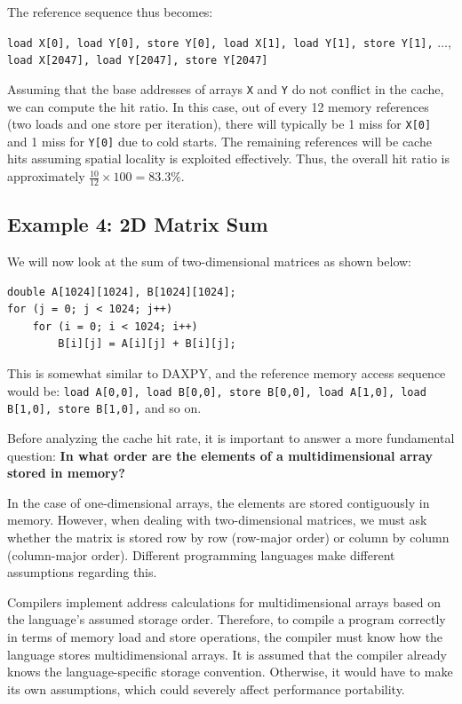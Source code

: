\documentclass[12pt]{book}
\begin{document}
The reference sequence thus becomes: 
\begin{center}
\texttt{load X[0], load Y[0], store Y[0], load X[1], load Y[1], store Y[1],} $\dots$, \texttt{load X[2047], load Y[2047], store Y[2047]}
\end{center}

Assuming that the base addresses of arrays \texttt{X} and \texttt{Y} do not conflict in the cache, we can compute the hit ratio. In this case, out of every 12 memory references (two loads and one store per iteration), there will typically be 1 miss for \texttt{X[0]} and 1 miss for \texttt{Y[0]} due to cold starts. The remaining references will be cache hits assuming spatial locality is exploited effectively. Thus, the overall hit ratio is approximately $\frac{10}{12}\times 100 =  83.3\%$.

\subsection{Example 4: 2D Matrix Sum}
We will now look at the sum of two-dimensional matrices as shown below:

\begin{lstlisting}[style=cppstyle]
double A[1024][1024], B[1024][1024];
for (j = 0; j < 1024; j++)
    for (i = 0; i < 1024; i++)
        B[i][j] = A[i][j] + B[i][j];
\end{lstlisting}

This is somewhat similar to DAXPY, and the reference memory access sequence would be:  
\texttt{load A[0,0], load B[0,0], store B[0,0], load A[1,0], load B[1,0], store B[1,0],} and so on.

Before analyzing the cache hit rate, it is important to answer a more fundamental question:  
\textbf{In what order are the elements of a multidimensional array stored in memory?}

In the case of one-dimensional arrays, the elements are stored contiguously in memory. However, when dealing with two-dimensional matrices, we must ask whether the matrix is stored row by row (row-major order) or column by column (column-major order). Different programming languages make different assumptions regarding this.

Compilers implement address calculations for multidimensional arrays based on the language's assumed storage order. Therefore, to compile a program correctly in terms of memory load and store operations, the compiler must know how the language stores multidimensional arrays. It is assumed that the compiler already knows the language-specific storage convention. Otherwise, it would have to make its own assumptions, which could severely affect performance portability.
\end{document}
